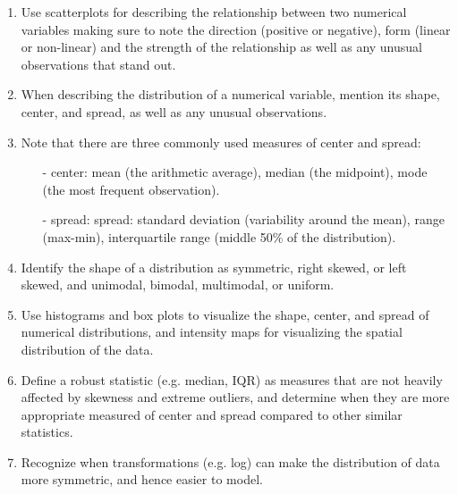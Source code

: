 \documentclass[11pt]{article}
\begin{document}
\begin{enumerate}[resume]
\renewcommand\labelenumi{\textcolor{light}{\textbf{LO \theenumi.}}}
\item Use scatterplots for describing the relationship between two numerical variables making sure to note the direction (positive or negative), form (linear or non-linear) and the strength of the relationship as well as any unusual observations that stand out.
\item When describing the distribution of a numerical variable, mention its shape, center, and spread, as well as any unusual observations.
\item Note that there are three commonly used measures of center and spread: 
\begin{itemize}
\item[-] center: mean (the arithmetic average), median (the midpoint), mode (the most frequent observation).
\item[-] spread: spread: standard deviation (variability around the mean), range (max-min), interquartile range (middle 50\% of the distribution).
\end{itemize}
\item Identify the shape of a distribution as symmetric, right skewed, or left skewed, and unimodal, bimodal, multimodal, or uniform.
\item Use histograms and box plots to visualize the shape, center, and spread of numerical distributions, and intensity maps for visualizing the spatial distribution of the data.
\item Define a robust statistic (e.g. median, IQR) as measures that are not heavily affected by skewness and extreme outliers, and determine when they are more appropriate measured of center and spread compared to other similar statistics.
\item Recognize when transformations (e.g. log) can make the distribution of data more symmetric, and hence easier to model.
\end{enumerate}
\end{document}
